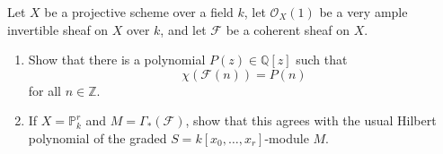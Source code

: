 \documentclass[12pt]{article}
\begin{document}
\begin{exercise}
    Let $X$ be a projective scheme over a field $k$, let $\mathcal O_X(1)$ be a very ample invertible sheaf on $X$ over $k$, and let $\mathcal F$ be a coherent sheaf on $X$.
    \begin{enumerate}
        \item Show that there is a polynomial $P(z)\in \mathbb Q[z]$ such that
              \[
                  \chi(\mathcal F(n))=P(n)
              \]
              for all $n\in \mathbb Z$.

        \item If $X=\mathbb P^r_k$ and $M=\Gamma_*(\mathcal F)$, show that this agrees with the usual Hilbert polynomial of the graded $S=k[x_0,\dots,x_r]$-module $M$.
    \end{enumerate}
\end{exercise}
\end{document}
